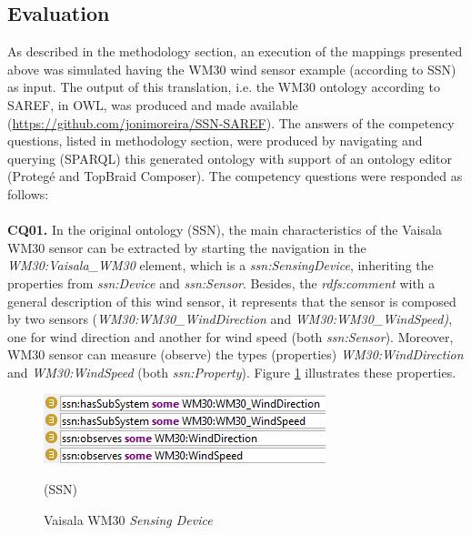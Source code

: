 \documentclass{sig-alternate-05-2015}
\begin{document}
\subsection{Evaluation}
As described in the methodology section, an execution of the mappings presented above was simulated having the WM30 wind sensor example (according to SSN) as input. The output of this translation, i.e. the WM30 ontology according to SAREF, in OWL, was produced and made available (\url{https://github.com/jonimoreira/SSN-SAREF}). The answers of the competency questions, listed in methodology section, were produced by navigating and querying (SPARQL) this generated ontology with support of an ontology editor (Protegé and TopBraid Composer). The competency questions were responded as follows:
\\\\\textbf{CQ01.} In the original ontology (SSN), the main characteristics of the Vaisala WM30 sensor can be extracted by starting the navigation in the \textit{WM30:Vaisala\_WM30} element, which is a \textit{ssn:SensingDevice}, inheriting the properties from \textit{ssn:Device} and \textit{ssn:Sensor}. Besides, the \textit{rdfs:comment} with a general description of this wind sensor, it represents that the sensor is composed by two sensors (\textit{WM30:WM30\_WindDirection} and \textit{WM30:WM30\_WindSpeed)}, one for wind direction and another for wind speed (both \textit{ssn:Sensor}). Moreover, WM30 sensor can measure (observe) the types (properties) \textit{WM30:WindDirection} and \textit{WM30:WindSpeed} (both \textit{ssn:Property}). Figure \ref{fig:SSN_SystemProperties} illustrates these properties.

\begin{figure}[h!]
\centering
\includegraphics[scale=0.98]{SSN_SystemProperties}
\caption{Vaisala WM30 \textit{Sensing Device}} (SSN)
\label{fig:SSN_SystemProperties}
\end{figure}
\end{document}
